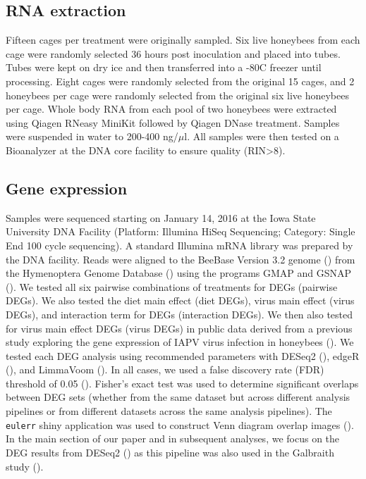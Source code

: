 \documentclass[11pt,a4paper,oldfontcommands,openany]{memoir}
\numberwithin{equation}{section} %
\newcommand{\pkg}[1]{{\texttt{#1}}}
\begin{document}
\subsection{RNA extraction}

Fifteen cages per treatment were originally sampled. Six live honeybees from each cage were randomly selected 36 hours post inoculation and placed into tubes. Tubes were kept on dry ice and then transferred into a -80C freezer until processing. Eight cages were randomly selected from the original 15 cages, and 2 honeybees per cage were randomly selected from the original six live honeybees per cage. Whole body RNA from each pool of two honeybees were extracted using Qiagen RNeasy MiniKit followed by Qiagen DNase treatment. Samples were suspended in water to 200-400 ng/$\mu$l. All samples were then tested on a Bioanalyzer at the DNA core facility to ensure quality (RIN>8).

\subsection{Gene expression}

Samples were sequenced starting on January 14, 2016 at the Iowa State University DNA Facility (Platform: Illumina HiSeq Sequencing; Category: Single End 100 cycle sequencing). A standard Illumina mRNA library was prepared by the DNA facility. Reads were aligned to the BeeBase Version 3.2 genome (\citealt{hbGenome}) from the Hymenoptera Genome Database (\citealt{hymenopteraDB}) using the programs GMAP and GSNAP (\citealt{gsnap}). We tested all six pairwise combinations of treatments for DEGs (pairwise DEGs). We also tested the diet main effect (diet DEGs), virus main effect (virus DEGs), and interaction term for DEGs (interaction DEGs). We then also tested for virus main effect DEGs (virus DEGs) in public data derived from a previous study exploring the gene expression of IAPV virus infection in honeybees (\citealt{galbraith}). We tested each DEG analysis using recommended parameters with DESeq2 (\citealt{deseq2}), edgeR (\citealt{edger}), and LimmaVoom (\citealt{limma}). In all cases, we used a false discovery rate (FDR) threshold of 0.05 (\citealt{benjamini}). Fisher's exact test was used to determine significant overlaps between DEG sets (whether from the same dataset but across different analysis pipelines or from different datasets across the same analysis pipelines). The \pkg{eulerr} shiny application was used to construct Venn diagram overlap images (\citealt{euler}). In the main section of our paper and in subsequent analyses, we focus on the DEG results from DESeq2 (\citealt{deseq2}) as this pipeline was also used in the Galbraith study (\citealt{galbraith}).
\end{document}
